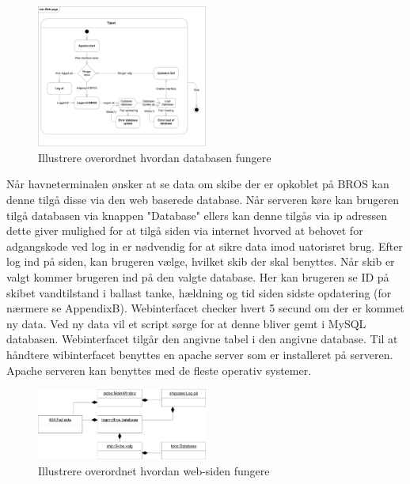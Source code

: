 \begin{figure}[H]
\centering
\includegraphics[width = 0.5\textwidth]{billeder/Systemarkitektur/stm_web}
\caption{Illustrere overordnet hvordan databasen fungere}
\label{fig:stm_web}
\end{figure}

Når havneterminalen ønsker at se data om skibe der er opkoblet på BROS kan denne tilgå disse via den web baserede database. Når serveren køre kan brugeren tilgå databasen via knappen "Database" ellers kan denne tilgås via ip adressen dette giver mulighed for at tilgå siden via internet hvorved at behovet for adgangskode ved log in er nødvendig for at sikre data imod uatorisret brug. Efter log ind på siden, kan brugeren vælge, hvilket skib der skal benyttes. Når skib er valgt kommer brugeren ind på den valgte database. Her kan brugeren se ID på skibet vandtilstand i ballast tanke, hældning og tid siden sidste opdatering (for nærmere se AppendixB). Webinterfacet checker hvert 5 secund om der er kommet ny data. Ved ny data vil et script sørge for at denne bliver gemt i MySQL databasen. Webinterfacet tilgår den angivne tabel i den angivne database. Til at håndtere wibinterfacet benyttes en apache server som er installeret på serveren. Apache serveren kan benyttes med de fleste operativ systemer.

\begin{figure}[H]
\centering
\includegraphics[width = 0.5\textwidth]{billeder/database_web}
\caption{Illustrere overordnet hvordan web-siden fungere}
\label{fig:database_web}
\end{figure}

